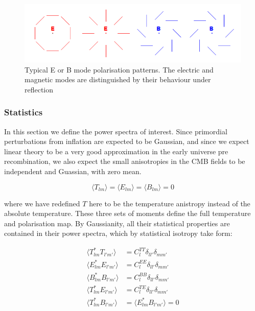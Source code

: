 \documentclass[a4paper,10pt]{article}
\begin{document}
\begin{figure}[h]
  \includegraphics[width=\linewidth]{EBpicture.png}
  \caption{Typical E or B mode polarisation patterns. The electric and magnetic modes are distinguished by their behaviour under reflection}
\end{figure}

\subsubsection{Statistics}


In this section we define the power spectra of interest. Since primordial perturbations from inflation are expected to be Gaussian, and since we expect linear theory to be a very good approximation in the early universe pre recombination, we also expect the small anisotropies in the CMB fields to be independent and Guassian, with zero mean. 

\begin{equation}
\langle T_{lm} \rangle = \langle E_{lm} \rangle = \langle B_{lm} \rangle = 0
\end{equation}

where we have redefined $T$ here to be the temperature anistropy instead of the absolute temperature. These three sets of moments define the full temperature and polarisation map. By Gaussianity, all their statistical properties are contained in their power spectra, which by statistical isotropy take form:


\begin{equation}\begin{split}
\langle T_{lm}^*T_{l'm'} \rangle &= C^{TT}_l\delta_{ll'}\delta_{mm'}\\
\langle E_{lm}^*E_{l'm'} \rangle &= C^{EE}_l\delta_{ll'}\delta_{mm'}\\
\langle B_{lm}^*B_{l'm'} \rangle &= C^{BB}_l\delta_{ll'}\delta_{mm'}\\
\langle T_{lm}^*E_{l'm'} \rangle &= C^{TE}_l\delta_{ll'}\delta_{mm'}\\
\langle T_{lm}^*B_{l'm'} \rangle &= \langle E_{lm}^*B_{l'm'} \rangle = 0
\end{split}\end{equation}
\end{document}
